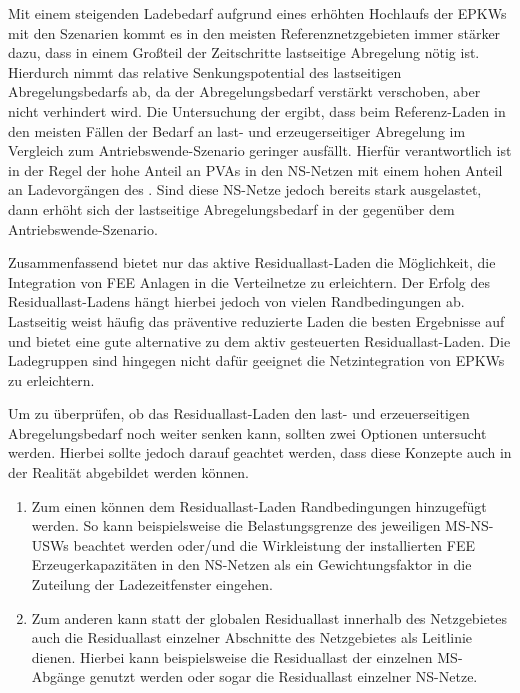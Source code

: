 Mit einem steigenden Ladebedarf aufgrund eines erhöhten Hochlaufs der \glspl{EPKW} mit den Szenarien kommt es in den meisten Referenznetzgebieten immer stärker dazu, dass in einem Großteil der Zeitschritte lastseitige Abregelung nötig ist.
Hierdurch nimmt das relative Senkungspotential des lastseitigen Abregelungsbedarfs ab, da der Abregelungsbedarf verstärkt verschoben, aber nicht verhindert wird.
Die Untersuchung der \SzeFirmenparkplatz ergibt, dass beim Referenz-Laden in den meisten Fällen der Bedarf an last- und erzeugerseitiger Abregelung im Vergleich zum Antriebswende-Szenario geringer ausfällt.
Hierfür verantwortlich ist in der Regel der hohe Anteil an \glspl{PVA} in den \gls{NS}-Netzen mit einem hohen Anteil an Ladevorgängen des \UC \zHdot.
Sind diese \gls{NS}-Netze jedoch bereits stark ausgelastet, dann erhöht sich der lastseitige Abregelungsbedarf in der \SzeFirmenparkplatz gegenüber dem Antriebswende-Szenario.\medskip

Zusammenfassend bietet nur das aktive Residuallast-Laden die Möglichkeit, die Integration von \gls{FEE} Anlagen in die Verteilnetze zu erleichtern.
Der Erfolg des Residuallast-Ladens hängt hierbei jedoch von vielen Randbedingungen ab.
Lastseitig weist häufig das präventive reduzierte Laden die besten Ergebnisse auf und bietet eine gute alternative zu dem aktiv gesteuerten Residuallast-Laden.
Die Ladegruppen sind hingegen nicht dafür geeignet die Netzintegration von \glspl{EPKW} zu erleichtern.\medskip

Um zu überprüfen, ob das Residuallast-Laden den last- und erzeuerseitigen Abregelungsbedarf noch weiter senken kann, sollten zwei Optionen untersucht werden.
Hierbei sollte jedoch darauf geachtet werden, dass diese Konzepte auch in der Realität abgebildet werden können.

\begin{enumerate}
	\item Zum einen können dem Residuallast-Laden Randbedingungen hinzugefügt werden.
	So kann beispielsweise die Belastungsgrenze des jeweiligen \gls{MS}-\gls{NS}-\glspl{USW} beachtet werden oder/und die Wirkleistung der installierten \gls{FEE} Erzeugerkapazitäten in den \gls{NS}-Netzen als ein Gewichtungsfaktor in die Zuteilung der Ladezeitfenster eingehen.
	\item Zum anderen kann statt der globalen Residuallast innerhalb des Netzgebietes auch die Residuallast einzelner Abschnitte des Netzgebietes als Leitlinie dienen.
	Hierbei kann beispielsweise die Residuallast der einzelnen \gls{MS}-Abgänge genutzt werden oder sogar die Residuallast einzelner \gls{NS}-Netze.
\end{enumerate}


